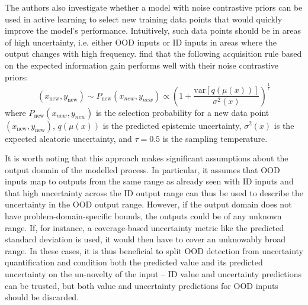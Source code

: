 The authors also investigate whether a model with noise contrastive priors can be used in active learning to select new training data points that would quickly improve the model's performance. Intuitively, such data points should be in areas of high uncertainty, i.e. either OOD inputs or ID inputs in areas where the output changes with high frequency. \citeauthor{noise-contrastive-uq-2020} find that the following acquisition rule based on the expected information gain performs well with their noise contrastive priors:
\begin{equation*}
    (x_\text{new}, y_\text{new}) \sim P_\text{new}(x_{new}, y_{new}) \propto \left( 1 + \frac{\text{var}[q(\mu(x))]}{\sigma^2(x)} \right)^{\frac{1}{\tau}}
\end{equation*}
where $P_\text{new}(x_{new}, y_{new})$ is the selection probability for a new data point $(x_\text{new}, y_\text{new})$, $q(\mu(x))$ is the predicted epistemic uncertainty, $\sigma^2(x)$ is the expected aleatoric uncertainty, and $\tau = 0.5$ is the sampling temperature.

\newpar It is worth noting that this approach makes significant assumptions about the output domain of the modelled process. In particular, it assumes that OOD inputs map to outputs from the same range as already seen with ID inputs and that high uncertainty across the ID output range can thus be used to describe the uncertainty in the OOD output range. However, if the output domain does not have problem-domain-specific bounds, the outputs could be of any unknown range. If, for instance, a coverage-based uncertainty metric like the predicted standard deviation is used, it would then have to cover an unknowably broad range. In these cases, it is thus beneficial to split OOD detection from uncertainty quantification and condition both the predicted value and its predicted uncertainty on the un-novelty of the input -- ID value and uncertainty predictions can be trusted, but both value and uncertainty predictions for OOD inputs should be discarded.
